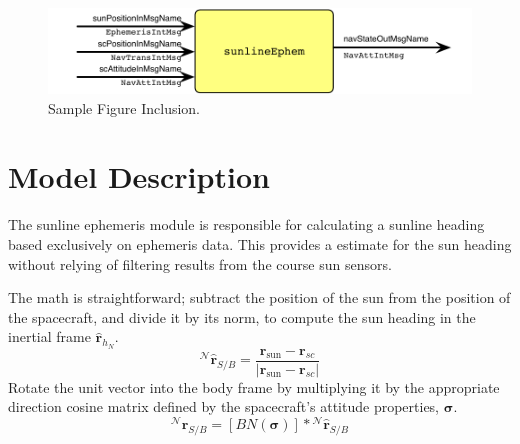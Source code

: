 

\begin{figure}[h]
	\centerline{
		\includegraphics{Figures/moduleIO}
	}
	\caption{Sample Figure Inclusion.}
	\label{fig:Fig1}
\end{figure}


\section{Model Description}

The sunline ephemeris module is responsible for calculating a sunline heading based exclusively on ephemeris data. This provides a estimate for the sun heading without relying of filtering results from the course sun sensors. 

The math is straightforward; subtract the position of the sun from the position of the spacecraft, and divide it by its norm, to compute the sun heading in the inertial frame $\hat{\bm{r}}_{h_N}$. 
\begin{equation}
	{}^{\mathcal N}\hat{\bm{r}}_{S/B} = \frac{\bm{\bm{r}}_{\text{sun}}-\bm{\bm{r}}_{sc}}{|\bm{\bm{r}}_{\text{sun}} - \bm{\bm{r}}_{sc}|}
\end{equation}
Rotate the unit vector into the body frame by multiplying it by the appropriate direction cosine matrix defined by the spacecraft's attitude properties, $\bm{\sigma}$. 
\begin{equation}
	{}^{\mathcal N}\hat{\bm{r}}_{S/B} = [BN(\bm{\sigma})]*{}^{\mathcal{N}}\hat{\bm{r}}_{S/B}
\end{equation}


